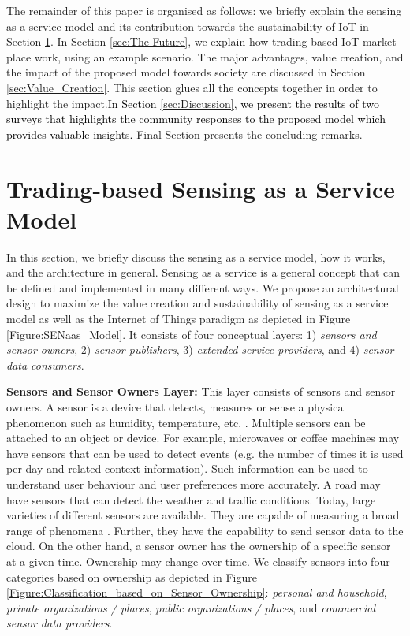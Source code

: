 \documentclass[conference]{IEEEtran}
\begin{document}
The remainder of this paper is organised as follows: we briefly explain the sensing as a service model and its contribution towards the sustainability of IoT in Section \ref{sec:Sensing_as_a_Service Model}. In Section \ref{sec:The Future}, we explain how trading-based IoT market place work, using an example scenario. The major advantages, value creation, and the impact of the proposed model towards society are discussed in Section \ref{sec:Value_Creation}. This section glues all the concepts together in order to highlight the impact.\textcolor{black}{In Section \ref{sec:Discussion}, we present the results of two surveys that highlights the community responses to the proposed model which provides valuable insights.} Final Section presents the concluding remarks.



\section{Trading-based Sensing as a Service Model}
\label{sec:Sensing_as_a_Service Model}

In this section, we briefly discuss the sensing as a service model, how it works, and the architecture in general. Sensing as a service is a general concept that can be defined and implemented in many different ways. We propose an architectural design to maximize the value creation and sustainability of sensing as a service model as well as the Internet of Things paradigm as depicted in Figure \ref{Figure:SENaas_Model}. It consists of four conceptual layers: 1) \textit{sensors and sensor owners}, 2) \textit{sensor publishers}, 3) \textit{extended service providers}, and 4) \textit{sensor data consumers}. 







\textbf{Sensors and Sensor Owners Layer:} This layer consists of sensors and sensor owners. A sensor is a device that detects, measures or sense a physical phenomenon such as humidity, temperature, etc. \cite{P009}. Multiple sensors can be attached to an object or device. For example, microwaves or coffee machines may have sensors that can be used to detect events (e.g. the number of times it is used per day and related context information). Such information can be used to understand user behaviour and user preferences more accurately. A road may have sensors that can detect the weather and traffic conditions. Today, large varieties of different sensors are available. They are capable of measuring a broad range of phenomena \cite{ZMP007}. Further, they have the capability to send  sensor data to the cloud. On the other hand, a sensor owner has the ownership of a specific sensor at a given time. Ownership may change over time. We classify sensors into four categories based on ownership as depicted in Figure \ref{Figure:Classification_based_on_Sensor_Ownership}: \textit{personal and household}, \textit{private organizations / places}, \textit{public organizations / places}, and \textit{commercial sensor data providers}. 
\end{document}
